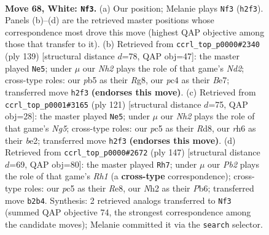 \documentclass[11pt]{article}
\begin{document}
\clearpage

\begin{figure}[p]\centering
\begin{subfigure}{0.46\textwidth}\centering
\resizebox{\linewidth}{!}{%
\newchessgame
\chessboard[
  setfen={8/5kp1/p2br2r/Pppb1p1p/2p2P1P/2B1P1P1/1P2K2N/1R4R1 w - - 8 68},
  showmover=false,
  pgfstyle=straightmove, color=movearrow, markmove={h2-f3}
]}
\caption{}
\end{subfigure}\hfill
\begin{subfigure}{0.46\textwidth}\centering
\resizebox{\linewidth}{!}{%
\newchessgame
\chessboard[
  setfen={5rr1/3nbp1k/b2p2pP/N1pP4/p3PB2/P5R1/1PB5/6RK b - - 0 70},
  showmover=false,
  pgfstyle=straightmove, color=movearrow, markmove={d7-e5}
]}
\caption{}
\end{subfigure}
\\[4pt]
\begin{subfigure}{0.46\textwidth}\centering
\resizebox{\linewidth}{!}{%
\newchessgame
\chessboard[
  setfen={r2r4/4k3/3pbpp1/p1p4p/P3P1nP/1PB3K1/2PRB1P1/3R4 b - - 59 61},
  showmover=false,
  pgfstyle=straightmove, color=movearrow, markmove={g4-e5}
]}
\caption{}
\end{subfigure}\hfill
\begin{subfigure}{0.46\textwidth}\centering
\resizebox{\linewidth}{!}{%
\newchessgame
\chessboard[
  setfen={4r2r/2pbpk2/1p1p4/pP1P1Pp1/P1P1R1P1/5BK1/4R3/8 b - - 14 74},
  showmover=false,
  pgfstyle=straightmove, color=movearrow, markmove={h8-h7}
]}
\caption{}
\end{subfigure}
\caption{\textbf{Move 68, White: \texttt{Nf3}.} (a) Our position; Melanie plays \texttt{Nf3} (\texttt{h2f3}). Panels (b)--(d) are the retrieved master positions whose correspondence most drove this move (highest QAP objective among those that transfer to it). (b) Retrieved from \texttt{ccrl\_top\_p0000\#2340} (ply 139) [structural distance $d$=78, QAP obj=47]: the master played \texttt{Ne5}; under $\mu$ our \emph{Nh2} plays the role of that game's \emph{Nd2}; cross-type roles: our \emph{p}b5 as their \emph{R}g8, our \emph{p}c4 as their \emph{B}e7; transferred move \texttt{h2f3} \textbf{(endorses this move)}. (c) Retrieved from \texttt{ccrl\_top\_p0001\#3165} (ply 121) [structural distance $d$=75, QAP obj=28]: the master played \texttt{Ne5}; under $\mu$ our \emph{Nh2} plays the role of that game's \emph{Ng5}; cross-type roles: our \emph{p}c5 as their \emph{R}d8, our \emph{r}h6 as their \emph{b}e2; transferred move \texttt{h2f3} \textbf{(endorses this move)}. (d) Retrieved from \texttt{ccrl\_top\_p0000\#2672} (ply 147) [structural distance $d$=69, QAP obj=80]: the master played \texttt{Rh7}; under $\mu$ our \emph{Pb2} plays the role of that game's \emph{Rh1} (a \textbf{cross-type} correspondence); cross-type roles: our \emph{p}c5 as their \emph{R}e8, our \emph{N}h2 as their \emph{P}b6; transferred move \texttt{b2b4}. Synthesis: 2 retrieved analogs transferred to \texttt{Nf3} (summed QAP objective 74, the strongest correspondence among the candidate moves); Melanie committed it via the \texttt{search} selector.}
\label{fig:thought-m134}
\end{figure}
\end{document}
